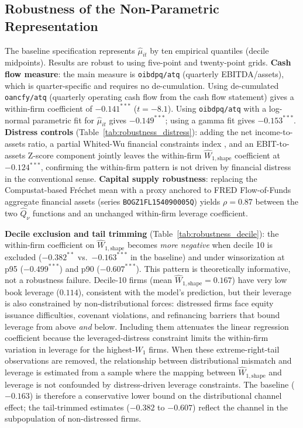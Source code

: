 \subsection{Robustness of the Non-Parametric Representation}
\label{app:distribution_robustness}

The baseline specification represents $\hat{\mu}_{it}$ by ten empirical quantiles (decile midpoints). Results are robust to using five-point and twenty-point grids. \textbf{Cash flow measure}: the main measure is \texttt{oibdpq/atq} (quarterly EBITDA/assets), which is quarter-specific and requires no de-cumulation. Using de-cumulated \texttt{oancfy/atq} (quarterly operating cash flow from the cash flow statement) gives a within-firm coefficient of $-0.141^{***}$ ($t = -8.1$). Using \texttt{oibdpq/atq} with a log-normal parametric fit for $\hat{\mu}_{it}$ gives $-0.149^{***}$; using a gamma fit gives $-0.153^{***}$. \textbf{Distress controls} (Table~\ref{tab:robustness_distress}): adding the net income-to-assets ratio, a partial Whited-Wu financial constraints index \citep{WhitedWu2006financial}, and an EBIT-to-assets Z-score component \citep{Altman1968} jointly leaves the within-firm $\widehat{W}_{1,\text{shape}}$ coefficient at $-0.124^{***}$, confirming the within-firm pattern is not driven by financial distress in the conventional sense. \textbf{Capital supply robustness}: replacing the Compustat-based Fr\'{e}chet mean with a proxy anchored to FRED Flow-of-Funds aggregate financial assets (series \texttt{BOGZ1FL154090005Q}) yields $\rho = 0.87$ between the two $\hat{Q}_\nu$ functions and an unchanged within-firm leverage coefficient.



\textbf{Decile exclusion and tail trimming} (Table~\ref{tab:robustness_decile}): the within-firm coefficient on $\widehat{W}_{1,\text{shape}}$ becomes \emph{more negative} when decile 10 is excluded ($-0.382^{**}$ vs.\ $-0.163^{***}$ in the baseline) and under winsorization at p95 ($-0.499^{***}$) and p90 ($-0.607^{***}$). This pattern is theoretically informative, not a robustness failure. Decile-10 firms (mean $\widehat{W}_{1,\text{shape}} = 0.167$) have very low book leverage ($0.114$), consistent with the model's prediction, but their leverage is also constrained by non-distributional forces: distressed firms face equity issuance difficulties, covenant violations, and refinancing barriers that bound leverage from above \emph{and} below. Including them attenuates the linear regression coefficient because the leveraged-distress constraint limits the within-firm variation in leverage for the highest-$W_1$ firms. When these extreme-right-tail observations are removed, the relationship between distributional mismatch and leverage is estimated from a sample where the mapping between $\widehat{W}_{1,\text{shape}}$ and leverage is not confounded by distress-driven leverage constraints. The baseline ($-0.163$) is therefore a conservative lower bound on the distributional channel effect; the tail-trimmed estimates ($-0.382$ to $-0.607$) reflect the channel in the subpopulation of non-distressed firms.

